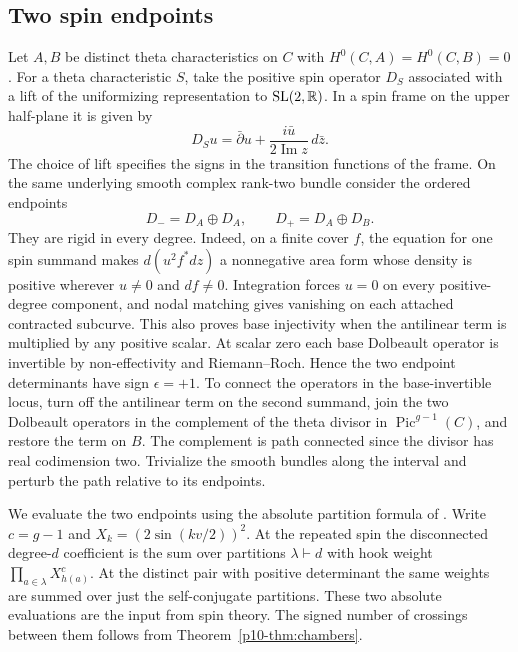 \subsection{Two spin endpoints}\label{p10-sec:examples}

Let $A,B$ be distinct theta characteristics on $C$ with
$H^0(C,A)=H^0(C,B)=0$. For a theta characteristic $S$, take the
positive spin operator $D_S$ associated with a lift of the
uniformizing representation to $\mathrm{SL}(2,\mathbb R)$. In a spin frame
on the upper half-plane it is given by
\[
                D_S u=\bar\partial u+
                    \frac{i\bar u}{2\operatorname{Im}z}\,d\bar z .
\]
The choice of lift specifies the signs in the transition functions of
the frame. On the same underlying smooth complex rank-two bundle
consider the ordered endpoints
\[
               D_-=D_A\oplus D_A,\qquad D_+=D_A\oplus D_B .
\]
They are rigid in every degree. Indeed, on a finite cover $f$, the
equation for one spin summand makes $d(u^2 f^*dz)$ a nonnegative area
form whose density is positive wherever $u\ne0$ and $df\ne0$.
Integration forces $u=0$ on every positive-degree component, and nodal
matching gives vanishing on each attached contracted subcurve. This
also proves base injectivity when the antilinear term is multiplied by
any positive scalar. At scalar zero each base Dolbeault operator is
invertible by non-effectivity and Riemann--Roch. Hence the two endpoint
determinants have sign $\epsilon=+1$. To connect the operators in the
base-invertible locus, turn off the antilinear term on the second
summand, join the two Dolbeault operators in the complement of the
theta divisor in $\operatorname{Pic}^{g-1}(C)$, and restore the term
on $B$. The complement is path connected since the divisor has real
codimension two. Trivialize the smooth bundles along the interval and
perturb the path relative to its endpoints.

We evaluate the two endpoints using the absolute partition formula
of \cite[Theorem~1.1]{WueSpin}. Write $c=g-1$ and
$X_k=(2\sin(kv/2))^2$. At the repeated spin the disconnected
degree-$d$ coefficient is the sum over partitions $\lambda\vdash d$
with hook weight $\prod_{a\in\lambda}X_{h(a)}^c$. At the distinct
pair with positive determinant the same weights are summed over just
the self-conjugate partitions. These two absolute evaluations are
the input from spin theory. The signed number of crossings between
them follows from Theorem~\ref{p10-thm:chambers}.

